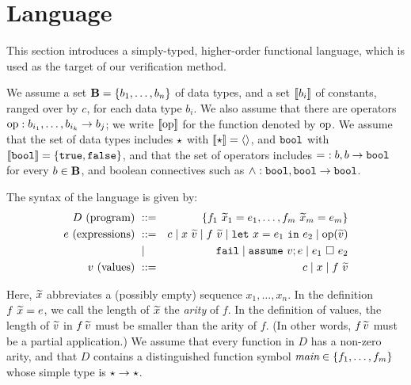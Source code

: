 \section{Language}
\label{sec:lang}

This section introduces a simply-typed, higher-order functional language, 
which is used as the target of our verification method.

We assume a set \(\mathbf{B} = \{b_1,\ldots,b_n\}\) of data types, and a set 
\([\![b_i]\!]\) of constants, ranged over by \(c\), for each data type 
\(b_i\). We also assume that there are operators 
\(\mathrm{op}:{b_{i_1},\ldots,b_{i_k}\rightarrow b_j}\); we write \([\![\mathrm{op}]\!]\) for the 
function denoted by \(\mathrm{op}\). We assume that the set of data types 
includes \(\star\) with \([\![\star]\!] = \langle{}\rangle\), and \(\mathtt{bool}\) 
with \([\![\mathtt{bool}]\!]=\{\mathtt{true}, \mathtt{false}\}\), and that the set of 
operators includes \(=\ :b,b\rightarrow \mathtt{bool}\) for every \(b\in \mathbf{B}\), and 
boolean connectives such as \(\land:\mathtt{bool},\mathtt{bool}\rightarrow \mathtt{bool}\).

The syntax of the language is given by:
\begin{eqnarray*}
D \mbox{ (program) }&::=& \set{f_1\ \seq{x}_1 = e_1,\ldots,f_m\ \seq{x}_m = e_m} \\
e \mbox{ (expressions) }
&::=& c \mid x\ \seq{v} \mid f\ \seq{v} \mid \LETEQIN{x}{e_1}{e_2} \mid \OP(\seq{v}) \\
&\mid& \FAIL \mid \ASSUME{v}{e} \mid \PAR{e_1}{e_2} \\ %
v \mbox{ (values) }&::=& c \mid x \mid f\ \seq{v} %
\end{eqnarray*}

Here, \(\widetilde{x}\) abbreviates a (possibly empty) sequence 
\(x_1,\ldots,x_n\). In the definition \(f\ \widetilde{x} = e\), we call the 
length of \(\widetilde{x}\) the \emph{arity} of \(f\). In the definition of 
values, the length of \(\widetilde{v}\) in \(f\,\widetilde{v}\) must be smaller than 
the arity of \(f\). (In other words, \(f\,\widetilde{v}\) must be a partial 
application.) We assume that every function in \(D\) has a non-zero 
arity, and that \(D\) contains a distinguished function symbol 
\(\textit{main}\in \{f_1,\ldots,f_m\}\) whose simple type is 
\(\star\rightarrow \star\).

